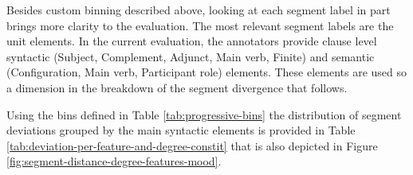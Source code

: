     Besides custom binning described above, looking at each segment label in part brings more clarity to the evaluation. The most relevant segment labels are the unit elements. In the current evaluation, the annotators provide clause level syntactic (Subject, Complement, Adjunct, Main verb, Finite) and semantic (Configuration, Main verb, Participant role) elements. These elements are used so a dimension in the breakdown of the segment divergence that follows. 

    Using the bins defined in Table \ref{tab:progressive-bins} the distribution of segment deviations grouped by the main syntactic elements is provided in Table \ref{tab:deviation-per-feature-and-degree-constit} that is also depicted in Figure \ref{fig:segment-distance-degree-features-mood}. 

    
    \begin{table}[!ht]
        \caption{Percentage of segments deviated to a given degree for major syntactic elements}
        \label{tab:deviation-per-feature-and-degree-constit}
    \end{table}

